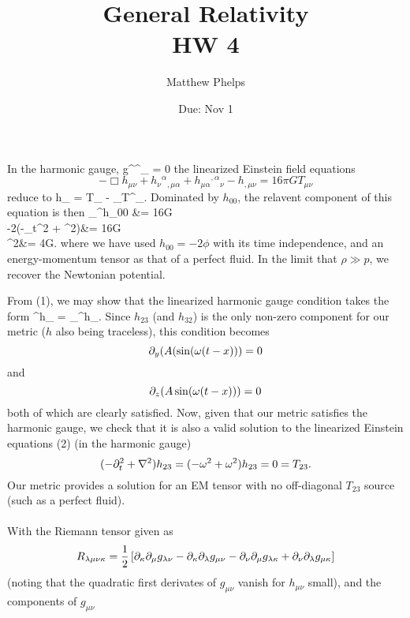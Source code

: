 \documentclass[10pt,letterpaper]{article}
\title{General Relativity\\HW 4}
\author{Matthew Phelps}
\date{Due: Nov 1}
\begin{document}
\maketitle

\benum
\item
In the harmonic gauge,
\be
	g^{\mu\nu}\Gamma^\lambda_{\mu\nu} = 0
\ee
the linearized Einstein field equations 
\[
	 -\Box h_{\mu\nu} + h_\nu{}^{\alpha}{}_{,\mu\alpha} + h_{\mu\alpha}{}^{,\alpha}{}_{\nu} - h_{,\mu\nu} = 16\pi G T_{\mu\nu}
\]
reduce to
\be
	\Box h_{\mu\nu} = T_{\mu\nu} -  \eta_{\mu\nu}T^\lambda{}_\lambda.
\ee
Dominated by $h_{00}$, the relavent component of this equation is then
\ba
	\pd_\lambda \pd^\lambda h_{00} &= 16\pi G\\
	-2(-\pd_t^2 + \del^2)\phi &= 16\pi G\\
	\del^2\phi &= 4\pi G.
\ea
where we have used $h_{00} = -2\phi$ with its time independence, and an energy-momentum tensor as that of a perfect fluid. In the limit that $\rho \gg p$, we recover the Newtonian potential. 
\item 
\benum
\item
From (1), we may show that the linearized harmonic gauge condition takes the form
\be
	\pd^\mu h_{\mu\nu} =  \pd_\nu \eta^{\alpha\beta}h_{\alpha\beta}.
\ee
Since $h_{23}$ (and $h_{32}$) is the only non-zero component for our metric ($h$ also being traceless), this condition becomes
\[
	\partial_y (A(\sin(\omega(t-x))) = 0
\]
and
\[
	\partial_z (A\sin(\omega(t-x))) = 0
\]
both of which are clearly satisfied. Now, given that our metric satisfies the harmonic gauge, we check that it is also a valid solution to the linearized Einstein equations (2) (in the harmonic gauge)
\[
	(-\partial_t^2 + \nabla^2)h_{23} = (-\omega^2+\omega^2)h_{23} = 0 = T_{23}.
\]	
Our metric provides a solution for an EM tensor with no off-diagonal $T_{23}$ source (such as a perfect fluid). 
\\ \\
With the Riemann tensor given as
\[
	R_{\lambda\mu\nu\kappa} = \frac12 \left[ \partial_\kappa\partial_\mu g_{\lambda\nu} - \partial_\kappa\partial_\lambda g_{\mu\nu}
	-\partial_\nu\partial_\mu g_{\lambda\kappa} + \partial_\nu\partial_\lambda g_{\mu\kappa}\right]
\]
(noting that the quadratic first derivates of $g_{\mu\nu}$ vanish for $h_{\mu\nu}$ small), and the components of $g_{\mu\nu}$
\end{document}
